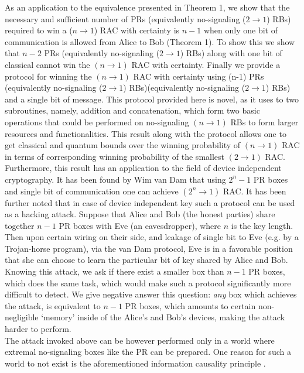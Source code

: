\documentclass[%
 reprint,
 amsmath,amssymb,
 aps,
]{revtex4-1}
\begin{document}
As an application to the equivalence presented in Theorem 1, we show that the necessary and sufficient number of PRs (equivalently no-signaling ($2 \rightarrow 1$) RBs) required to win a ($n \rightarrow 1$) RAC with certainty is $n-1$ when only one bit of communication is allowed from Alice to Bob (Theorem 1). To show this we show that $n-2$ PRs (equivalently no-signaling ($2 \rightarrow 1$) RBs) along with one bit of classical cannot win the $(n\rightarrow 1)$ RAC with certainty. Finally we provide a protocol for winning the $(n\rightarrow 1)$ RAC with certainty using (n-1) PRs (equivalently no-signaling ($2 \rightarrow 1$) RBs)(equivalently no-signaling ($2 \rightarrow 1$) RBs) and a single bit of message. This protocol provided here is novel, as it uses to two subroutines, namely, addition and concatenation, which form two basic operations that could be performed on no-signaling $(n\rightarrow 1)$ RBs to form larger resources and functionalities. This result along with the protocol allows one to get classical and quantum bounds over the winning probability of $(n\rightarrow 1)$ RAC in terms of corresponding winning probability of the smallest $(2\rightarrow 1)$ RAC. Furthermore, this result has an application to the field of device independent cryptography. It has been found by Wim van Dam \cite{WvD05} that using $2^n-1$ PR boxes and single bit of communication one can achieve $(2^n \rightarrow 1)$ RAC. It has been further noted \cite{Colbeck} that
in case of device independent key such a protocol can be used as a hacking attack. Suppose that Alice and Bob (the honest parties) share together $n-1$ PR boxes with Eve (an eavesdropper), where $n$ is the key length. Then upon certain wiring on their side, and leakage of single bit to Eve (e.g. by a Trojan-horse program), via the van Dam protocol, Eve is in a favorable position that she can choose to learn the particular bit of key shared by Alice and Bob. Knowing this attack, we ask if there exist a smaller box than $n-1$ PR boxes, which does the same task, which would make such a protocol significantly more difficult to detect. We give negative answer this question:
{\it any} box which achieves the attack, is equivalent to $n-1$ PR boxes, which amounts to certain non-negligible `memory' inside of the Alice's and Bob's devices,
making the attack harder to perform.  \\
The attack invoked above can be however performed only in a world where extremal no-signaling boxes like the PR can be prepared. One reason for such a world to not exist is the aforementioned information causality principle \cite{pawlowski-2009-461}.
\end{document}
